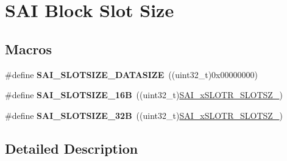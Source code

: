 \hypertarget{group___s_a_i___block___slot___size}{}\section{S\+AI Block Slot Size}
\label{group___s_a_i___block___slot___size}
\subsection*{Macros}
\begin{DoxyCompactItemize}
\item 
\#define {\bfseries S\+A\+I\+\_\+\+S\+L\+O\+T\+S\+I\+Z\+E\+\_\+\+D\+A\+T\+A\+S\+I\+ZE}~((uint32\+\_\+t)0x00000000)\hypertarget{group___s_a_i___block___slot___size_gaa85acfa33aa792a7803ba917db3f08f2}{}\label{group___s_a_i___block___slot___size_gaa85acfa33aa792a7803ba917db3f08f2}

\item 
\#define {\bfseries S\+A\+I\+\_\+\+S\+L\+O\+T\+S\+I\+Z\+E\+\_\+16B}~((uint32\+\_\+t)\hyperlink{group___peripheral___registers___bits___definition_gab43df0af67bd0155111e18bcecbdf7ad}{S\+A\+I\+\_\+x\+S\+L\+O\+T\+R\+\_\+\+S\+L\+O\+T\+S\+Z\+\_})\hypertarget{group___s_a_i___block___slot___size_ga162df23d26b0770b617f8406cf6a0110}{}\label{group___s_a_i___block___slot___size_ga162df23d26b0770b617f8406cf6a0110}

\item 
\#define {\bfseries S\+A\+I\+\_\+\+S\+L\+O\+T\+S\+I\+Z\+E\+\_\+32B}~((uint32\+\_\+t)\hyperlink{group___peripheral___registers___bits___definition_gaf84f10c4f64d886eed350d7227f112a2}{S\+A\+I\+\_\+x\+S\+L\+O\+T\+R\+\_\+\+S\+L\+O\+T\+S\+Z\+\_})\hypertarget{group___s_a_i___block___slot___size_ga0cadd0839e8bb4ee8dd81db62184330f}{}\label{group___s_a_i___block___slot___size_ga0cadd0839e8bb4ee8dd81db62184330f}

\end{DoxyCompactItemize}


\subsection{Detailed Description}
